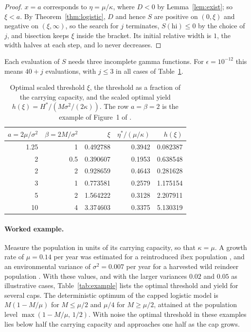 \documentclass[11pt]{article}
\theoremstyle{definition}
\begin{document}
\begin{proof}
$x = a$ corresponds to $\eta = \mu/\kappa$, where $D < 0$ by Lemma~\ref{lem:exist}; so $\xi < a$. By
Theorem~\ref{thm:logistic}, $D$ and hence $S$ are positive on $(0,\xi)$ and negative on $(\xi,\infty)$, so the
search for $j$ terminates, $S(\mathrm{hi}) \le 0$ by the choice of $j$, and bisection keeps $\xi$ inside the
bracket. Its initial relative width is $1$, the width halves at each step, and $\mathrm{lo}$ never decreases.
\end{proof}

Each evaluation of $S$ needs three incomplete gamma functions. For $\epsilon = 10^{-12}$ this means $40 + j$ evaluations, with $j \le 3$ in all cases of Table~\ref{tab:xi}.

\begin{table}[t]
\centering
\begin{tabular}{rrrrr}
\toprule
$a = 2\mu/\sigma^2$ & $\beta = 2M/\sigma^2$ & $\xi$ & $\eta^*/(\mu/\kappa)$ & $h(\xi)$\\
\midrule
1.25 & 1 & 0.492788 & 0.3942 & 0.082387\\
2 & 0.5 & 0.390607 & 0.1953 & 0.638548\\
2 & 2 & 0.928659 & 0.4643 & 0.281628\\
3 & 1 & 0.773581 & 0.2579 & 1.175154\\
5 & 2 & 1.564222 & 0.3128 & 2.207911\\
10 & 4 & 3.374603 & 0.3375 & 5.130319\\
\bottomrule
\end{tabular}
\caption{Optimal scaled threshold $\xi$, the threshold as a fraction of the carrying capacity, and the scaled
optimal yield $h(\xi) = H^*/(M\sigma^2/(2\kappa))$. The row $a = \beta = 2$ is the example of Figure~1 of
\cite{hening19}.}
\label{tab:xi}
\end{table}

\paragraph{Worked example.}
Measure the population in units of its carrying capacity, so that $\kappa = \mu$. A growth rate of
$\mu = 0.14$ per year was estimated for a reintroduced ibex population \cite{saether02}, and an environmental
variance of $\sigma^2 = 0.007$ per year for a harvested wild reindeer population \cite{kvalnes24}. With these
values, and with the larger variances $0.02$ and $0.05$ as illustrative cases, Table~\ref{tab:example} lists the
optimal threshold and yield for several caps. The deterministic optimum of the capped logistic model is
$M(1 - M/\mu)$ for $M \le \mu/2$ and $\mu/4$ for $M \ge \mu/2$, attained at the population level
$\max(1 - M/\mu,\, 1/2)$. With noise the optimal
threshold in these examples lies below half the carrying capacity and approaches one half as the cap grows.
\end{document}
